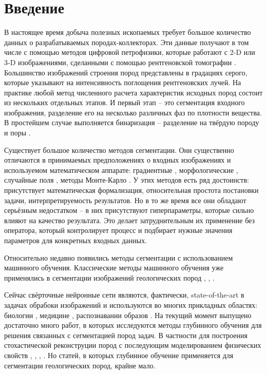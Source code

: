 \documentclass[12pt, a4paper]{extarticle}
\begin{document}
\newpage

\tableofcontents

\newpage


\section{Введение} \label{intro}

В настоящее время добыча полезных ископаемых требует большое количество 
данных о разрабатываемых породах-коллекторах. Эти данные получают в том числе с помощью методов цифровой петрофизики, которые работают с  
2-D или 3-D изображениями, сделанными с помощью рентгеновской томографии \cite{1}. Большинство изображений строения пород представлены в градациях серого, которые указывают на интенсивность поглощения рентгеновских лучей. На практике любой метод численного расчета характеристик исходных пород состоит из нескольких отдельных этапов. 
И первый этап -- это сегментация входного изображения, разделение его
на несколько различных фаз по плотности вещества. В простейшем случае выполняется бинаризация -- разделение на твёрдую породу и поры \cite{2}. 

Существует большое количество методов сегментации. Они существенно отличаются в принимаемых предположениях о входных изображениях и используемом математическом аппарате: градиентные \cite{13}, морфологические \cite{17}, случайные поля \cite{14}, методы Монте-Карло \cite{16}. У этих методов есть ряд достоинств: присутствует математическая формализация, относительная простота постановки задачи, интерпретируемость результатов. Но в то же время все они обладают серьёзным недостатком -- в них присутствуют гиперпараметры, которые сильно влияют на качество результата. Это делает затруднительным их применение без оператора, который контролирует процесс и подбирает нужные значения параметров для  конкретных входных данных. 

Относительно недавно появились методы сегментации с использованием машинного обучения. Классические методы машинного обучения уже применялись в сегментации изображений геологических пород \cite{3}, \cite{4}, \cite{5}.

Сейчас свёрточные нейронные сети являются, фактически, state-of-the-art в задачах обрабоки изображений и используются во многих прикладных областях: биологии \cite{6}, медицине \cite{18}, распознавании образов \cite{11}. На текущий момент выпущено достаточно много работ, в которых исследуются методы глубинного обучения для решения связанных с сегментацией пород задач. В частности для  построения стохастической реконструции пород с последующим моделированием физических свойств \cite{7}, \cite{8}, \cite{9}, \cite{10}. Но статей, в которых глубинное обучение применяется для сегментации геологических пород, крайне мало. 
\end{document}
